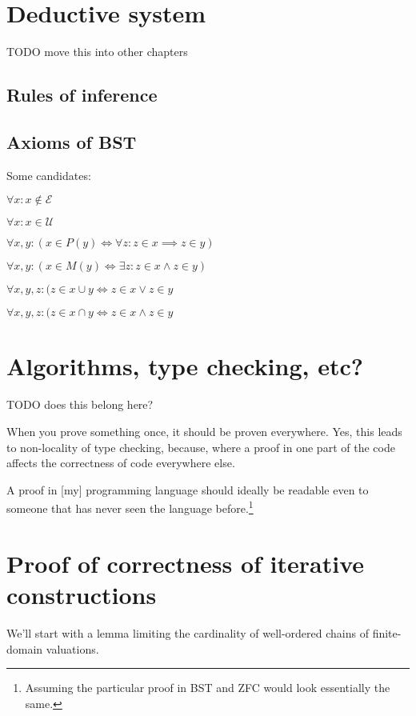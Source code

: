 \documentclass[oneside,12pt]{book}
\theoremstyle{definition}
\theoremstyle{remark}
\newcommand{\pSet}{P}
\newcommand{\mSet}{M}
\newcommand{\Empty}{\mathcal{E}}
\newcommand{\Universal}{\mathcal{U}}
\begin{document}
\chapter{Deductive system}
TODO move this into other chapters

\section{Rules of inference}

\section{Axioms of BST}
Some candidates:

$\forall x\colon x \notin \Empty$

$\forall x\colon x \in \Universal$

$\forall x,y\colon (x \in \pSet(y) \iff \forall z\colon z \in x \implies z \in y)$

$\forall x,y\colon (x \in \mSet(y) \iff \exists z\colon z \in x \land z \in y)$

$\forall x,y,z\colon (z \in x \cup y \iff z \in x \lor z \in y$

$\forall x,y,z\colon (z \in x \cap y \iff z \in x \land z \in y$


\chapter{Algorithms, type checking, etc?}

TODO does this belong here?

 When you prove something once, it should be proven
everywhere. Yes, this leads to non-locality of type checking, because, where a proof
in one part of the code affects the correctness of code everywhere else.

A proof in [my] programming language should ideally be readable even to someone that has
never seen the language before.\footnote{Assuming the particular proof in BST and ZFC
would look essentially the same.}


\printbibliography[heading=bibintoc,resetnumbers=0]

\appendix

\chapter{Proof of correctness of iterative constructions}\label{proofCoConst}

We'll start with a lemma limiting the cardinality of well-ordered chains
of finite-domain valuations.
\end{document}
